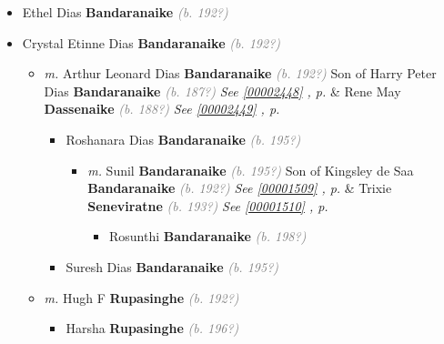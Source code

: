 \documentclass[10pt, openany]{book}
\begin{document}
\begin{itemize}
{\begin{itemize}
{\begin{itemize}
{\begin{itemize}
{\begin{itemize}
{\begin{itemize}
\item{Ethel Dias \textbf{Bandaranaike} \textcolor{gray}{\textit{(b. 192?)}}
  }
\item{Crystal Etinne Dias \textbf{Bandaranaike} \textcolor{gray}{\textit{(b. 192?)}}
\begin{itemize}
\item{\textit{m.} Arthur Leonard Dias \textbf{Bandaranaike} \textcolor{gray}{\textit{(b. 192?)}} Son of  Harry Peter Dias \textbf{Bandaranaike} \textcolor{gray}{\textit{(b. 187?)}} \textcolor{slteal}{\textit{See  \autoref{00002448} \textit{, p. \pageref{00002448} }}}  \&  Rene May \textbf{Dassenaike} \textcolor{gray}{\textit{(b. 188?)}} \textcolor{slteal}{\textit{See  \autoref{00002449} \textit{, p. \pageref{00002449} }}}   \label{couple:00001502:00001503} \begin{itemize}
\item{Roshanara Dias \textbf{Bandaranaike} \textcolor{gray}{\textit{(b. 195?)}}
\begin{itemize}
\item{\textit{m.} Sunil \textbf{Bandaranaike} \textcolor{gray}{\textit{(b. 195?)}} Son of  Kingsley de Saa \textbf{Bandaranaike} \textcolor{gray}{\textit{(b. 192?)}} \textcolor{slteal}{\textit{See  \autoref{00001509} \textit{, p. \pageref{00001509} }}}  \&  Trixie \textbf{Seneviratne} \textcolor{gray}{\textit{(b. 193?)}} \textcolor{slteal}{\textit{See  \autoref{00001510} \textit{, p. \pageref{00001510} }}}   \label{couple:00001507:00001508} \begin{itemize}
\item{Rosunthi \textbf{Bandaranaike} \textcolor{gray}{\textit{(b. 198?)}}
 }
\end{itemize}}
\end{itemize}
  }
\item{Suresh Dias \textbf{Bandaranaike} \textcolor{gray}{\textit{(b. 195?)}}
  }
\end{itemize}}
\item{\textit{m.} Hugh F \textbf{Rupasinghe} \textcolor{gray}{\textit{(b. 192?)}}   \label{couple:00001502:00002177} \begin{itemize}
\item{Harsha \textbf{Rupasinghe} \textcolor{gray}{\textit{(b. 196?)}}
 }
\end{itemize}}
\end{itemize}
}
\end{itemize}}
\end{itemize}}
\end{itemize}}
\end{itemize}}
\end{itemize}}
\end{itemize}
\end{document}
